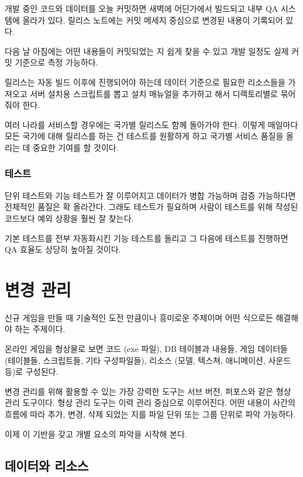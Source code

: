 \documentclass[chapter,kosection, 10.5pt, romanfixed, a4paper]{oblivoir}
\begin{document}
개발 중인 코드와 데이터를 오늘 커밋하면 새벽에 어딘가에서 빌드되고 내부 QA 시스템에
올라가 있다. 릴리스 노트에는 커밋 메세지 중심으로 변경된 내용이 기록되어 있다. 

다음 날 아침에는 어떤 내용들이 커밋되었는 지 쉽게 찾을 수 있고 개발 일정도 실제
커밋 기준으로 측정 가능하다. 

릴리스는 자동 빌드 이후에 진행되어야 하는데 데이터 기준으로 필요한 리소스들을 가져오고 
서버 설치용 스크립트를 뽑고 설치 매뉴얼을 추가하고 해서 디렉토리별로 묶어 줘야 한다. 

여러 나라를 서비스할 경우에는 국가별 릴리스도 함께 돌아가야 한다. 
이렇게 매일마다 모든 국가에 대해 릴리스를 하는 건 테스트를 원활하게 하고 
국가별 서비스 품질을 올리는 데 중요한 기여를 할 것이다. 

\subsection{테스트}

단위 테스트와 기능 테스트가 잘 이루어지고 데이터가 병합 가능하며 검증 가능하다면 
전체적인 품질은 확 올라간다. 그래도 테스트가 필요하며 사람이 테스트를 위해 작성된 
코드보다 예외 상황을 훨씬 잘 찾는다. 

기본 테스트를 전부 자동화시킨 기능 테스트를 돌리고 그 다음에 테스트를 진행하면 
QA 효율도 상당히 높아질 것이다. 


\chapter{변경 관리}

신규 게임을 만들 때 기술적인 도전 만큼이나 흥미로운 주제이며 어떤 식으로든 해결해야 하는 주제이다. 

온라인 게임을 형상물로 보면 코드 (exe 파일), DB 테이블과 내용들, 게임 데이터들 (테이블들, 스크립트들, 기타 구성파일들), 
리소스 (모델, 텍스쳐, 애니메이션, 사운드 등)로 구성된다. 

변경 관리를 위해 활용할 수 있는 가장 강력한 도구는 서브 버전, 퍼포스와 같은 형상 관리 도구이다. 형상 관리 
도구는 이력 관리 중심으로 이루어진다. 어떤 내용이 사간의 흐름에 따라 추가, 변경, 삭제 되었는 지를 파일 단위 또는
그룹 단위로 파악 가능하다. 

이제 이 기반을 갖고 개별 요소의 파악을 시작해 본다. 

\section{데이터와 리소스}
\end{document}
